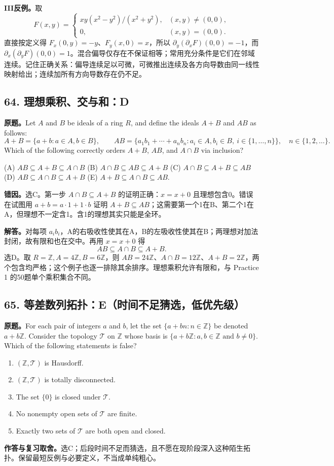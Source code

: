 \documentclass[11pt,a4paper,fontset=fandol]{ctexart}
\begin{document}
\textbf{III反例。}取
\[
F(x,y)=\begin{cases}xy(x^2-y^2)/(x^2+y^2),&(x,y)\ne(0,0),\\0,&(x,y)=(0,0).\end{cases}
\]
直接按定义得 $F_x(0,y)=-y$、$F_y(x,0)=x$，所以 $\partial_y(\partial_xF)(0,0)=-1$，而 $\partial_x(\partial_yF)(0,0)=1$。混合偏导仅存在不保证相等；常用充分条件是它们在邻域连续。记住正确关系：偏导连续足以可微，可微推出连续及各方向导数由同一线性映射给出；连续加所有方向导数存在仍不足。

\subsection{64. 理想乘积、交与和：D}
\label{ms:q64}
\textbf{原题。}Let $A$ and $B$ be ideals of a ring $R$, and define the ideals $A+B$ and $AB$ as follows:
\[
A+B=\{a+b:a\in A,b\in B\},\qquad
AB=\{a_1b_1+\cdots+a_nb_n:a_i\in A,b_i\in B,\ i\in\{1,\ldots,n\}\},\quad n\in\{1,2,\ldots\}.
\]
Which of the following correctly orders $A+B$, $AB$, and $A\cap B$ via inclusion?

(A) $AB\subseteq A+B\subseteq A\cap B$ \quad
(B) $A\cap B\subseteq AB\subseteq A+B$ \quad
(C) $A\cap B\subseteq A+B\subseteq AB$ \quad
(D) $AB\subseteq A\cap B\subseteq A+B$ \quad
(E) $A+B\subseteq A\cap B\subseteq AB$.

\textbf{错因。}选C。第一步 $A\cap B\subseteq A+B$ 的证明正确：$x=x+0$ 且理想包含0。错误在试图用 $a+b=a\cdot1+1\cdot b$ 证明 $A+B\subseteq AB$；这需要第一个1在B、第二个1在A，但理想不一定含1。含1的理想其实只能是全环。

\textbf{解答。}对每项 $a_ib_i$，A的右吸收性使其在A，B的左吸收性使其在B；两理想对加法封闭，故有限和也在交中。再用 $x=x+0$ 得
\[
\boxed{AB\subseteq A\cap B\subseteq A+B}.
\]
选D。取 $R=\mathbb Z,A=4\mathbb Z,B=6\mathbb Z$，则 $AB=24\mathbb Z$、$A\cap B=12\mathbb Z$、$A+B=2\mathbb Z$，两个包含均严格；这个例子也逐一排除其余排序。理想乘积允许有限和，与 Practice 1 的50题单个乘积集合不同。

\subsection{65. 等差数列拓扑：E（时间不足猜选，低优先级）}
\label{ms:q65}
\textbf{原题。}For each pair of integers $a$ and $b$, let the set $\{a+bn:n\in\mathbb Z\}$ be denoted $a+b\mathbb Z$. Consider the topology $\mathcal T$ on $\mathbb Z$ whose basis is $\{a+b\mathbb Z:a,b\in\mathbb Z\text{ and }b\ne0\}$. Which of the following statements is false?
\begin{enumerate}[label=(\Alph*)]
\item $(\mathbb Z,\mathcal T)$ is Hausdorff.
\item $(\mathbb Z,\mathcal T)$ is totally disconnected.
\item The set $\{0\}$ is closed under $\mathcal T$.
\item No nonempty open sets of $\mathcal T$ are finite.
\item Exactly two sets of $\mathcal T$ are both open and closed.
\end{enumerate}
\textbf{作答与复习取舍。}选C；后段时间不足而猜选，且不愿在现阶段深入这种陌生拓扑。保留最短反例与必要定义，不当成单纯粗心。
\end{document}
